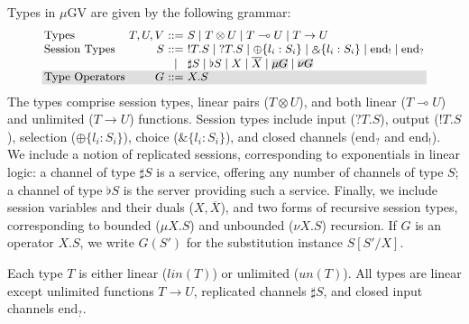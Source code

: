\documentclass[orivec,envcountsame]{llncs}
\newcommand{\with}{\mathbin\binampersand}
\newcommand{\gvdual}[1]{\overline{#1}}
\newcommand{\gvout}[2]{{!#1.#2}}
\newcommand{\gvin}[2]{{?#1.#2}}
\newcommand{\lto}{\ensuremath{\multimap}}
\newcommand{\uto}{\ensuremath{\rightarrow}}
\newcommand{\outterm}{\mathrm{end}_!}
\newcommand{\interm}{\mathrm{end}_?}
\newcommand{\gvserver}[1]{\flat #1}
\newcommand{\gvservice}[1]{\sharp #1}
\newcommand{\un}{un}
\newcommand{\lin}{lin}
\newcommand{\mugv}{$\mu\mathrm{GV}$\xspace}
\newcommand\shade[1]{\setlength{\fboxsep}{0pt}\colorbox{shade}{\ensuremath{#1}}}
\newcommand\shaderow{\noalign{\vskip-0.4pt}\rowcolor{shade}[0.6mm]}
\begin{document}
Types in \mugv are given by the following grammar:
\[
\small
\begin{array}{@{}l@{~}r@{~}c@{~}l@{}}
  \text{Types}         & T,U,V & ::= & S \mid T \otimes U \mid T \lto U \mid T \uto U \\
  \text{Session Types} & S     & ::= & \gvout{T}{S} \mid \gvin{T}{S}
                                \mid   \oplus \{ l_i : S_i \} \mid \with \{ l_i : S_i \}
                                \mid   \outterm \mid \interm \\
                            & & \mid & \gvservice{S} \mid \gvserver{S}
                                \mid   X \mid \gvdual{X}
                                \mid   \shade{\mu G} \mid \shade{\nu G} \\  \shaderow
  \text{Type Operators} & G    & ::= & X.S \\
\end{array}
\]%
%
The types comprise session types, linear pairs ($T \otimes U$), and both linear ($T \lto U$) and
unlimited ($T \uto U$) functions.
%
Session types include input ($\gvin{T}{S}$), output ($\gvout{T}{S}$), selection ($\oplus\{ l_i:S_i
\}$), choice ($\with\{l_i:S_i\}$), and closed channels ($\interm$ and $\outterm$).
We include a notion of replicated sessions, corresponding to exponentials in linear logic: a channel
of type $\gvservice{S}$ is a service, offering any number of channels of type $S$; a channel of type
$\gvserver{S}$ is the server providing such a service. Finally, we include session variables and
their duals ($X,\gvdual{X}$), and two forms of recursive session types, corresponding to bounded
($\mu X.S$) and unbounded ($\nu X.S$) recursion. If $G$ is an operator $X.S$, we write $G(S')$ for
the substitution instance $S[S'/X]$.

Each type $T$ is either linear ($\lin(T)$) or unlimited ($\un(T)$).
All types are linear except unlimited functions $T \uto U$, replicated channels $\gvservice{S}$, and
closed input channels $\interm$.
\end{document}
